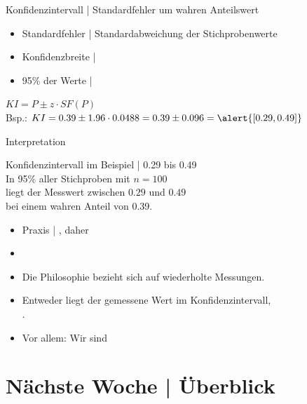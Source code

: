 \begin{frame}
  {Konfidenzintervall | Standardfehler um wahren Anteilswert}
  \begin{itemize}[<+->]
    \item Standardfehler | \alert{Standardabweichung} der Stichprobenwerte
    \item \alert{Konfidenzbreite} | 
    \item 95\% der Werte | 
  \end{itemize}
  \Doppelzeile
  \begin{center}
    \alert{$KI=P\pm z\cdot SF(P)$}\\
    \Zeile
  Bsp.: $KI=0.39\pm1.96\cdot 0.0488=0.39\pm0.096=\alert{[0.29, 0.49]}$
  \end{center}
\end{frame}

\begin{frame}
  {Interpretation}
  \begin{center}
    Konfidenzintervall im Beispiel | \alert{0.29 bis 0.49}\\
    \Halbzeile
    In 95\% aller Stichproben mit $n=100$\\
    liegt der Messwert zwischen $0.29$ und $0.49$\\
    bei einem wahren Anteil von 0.39.
  \end{center}
  \Zeile
  \begin{itemize}[<+->]
    \item Praxis | , daher 
    \Zeile
    \item {}
    \item Die Philosophie bezieht sich auf \alert{wiederholte Messungen}.
    \item Entweder liegt der gemessene Wert im Konfidenzintervall,\\
      .
    \item Vor allem: Wir sind 
  \end{itemize}
\end{frame}

\ifdefined\TITLE
  \section{Nächste Woche | Überblick}

